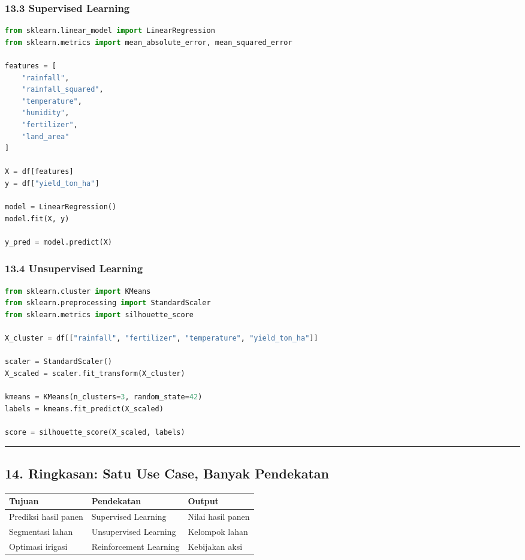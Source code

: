 \documentclass[12pt,a4paper]{article}
\begin{document}
\subsubsection{13.3 Supervised Learning}

\begin{lstlisting}[language=Python]
from sklearn.linear_model import LinearRegression
from sklearn.metrics import mean_absolute_error, mean_squared_error

features = [
    "rainfall",
    "rainfall_squared",
    "temperature",
    "humidity",
    "fertilizer",
    "land_area"
]

X = df[features]
y = df["yield_ton_ha"]

model = LinearRegression()
model.fit(X, y)

y_pred = model.predict(X)
\end{lstlisting}

\subsubsection{13.4 Unsupervised Learning}

\begin{lstlisting}[language=Python]
from sklearn.cluster import KMeans
from sklearn.preprocessing import StandardScaler
from sklearn.metrics import silhouette_score

X_cluster = df[["rainfall", "fertilizer", "temperature", "yield_ton_ha"]]

scaler = StandardScaler()
X_scaled = scaler.fit_transform(X_cluster)

kmeans = KMeans(n_clusters=3, random_state=42)
labels = kmeans.fit_predict(X_scaled)

score = silhouette_score(X_scaled, labels)
\end{lstlisting}

\hrule


\subsection{14. Ringkasan: Satu Use Case, Banyak Pendekatan}

\begin{tabular}{|l|l|l|}
\hline
Tujuan & Pendekatan & Output \\
\hline
Prediksi hasil panen & Supervised Learning & Nilai hasil panen \\
\hline
Segmentasi lahan & Unsupervised Learning & Kelompok lahan \\
\hline
Optimasi irigasi & Reinforcement Learning & Kebijakan aksi \\
\hline
\end{tabular}
\end{document}
